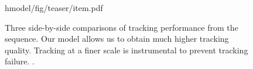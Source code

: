 \begin{figure}[H]
\centering
\begin{overpic}
[width=\linewidth]
{hmodel/fig/teaser/item.pdf}
\end{overpic}
\vspace{-.2in}
\caption{
% 
% 
Three side-by-side comparisons of tracking performance from the  sequence. Our model allows us to obtain much higher tracking quality.
Tracking at a finer scale is instrumental to prevent tracking failure. 
.
% 
%
}
\label{fig:teaser}
\end{figure}